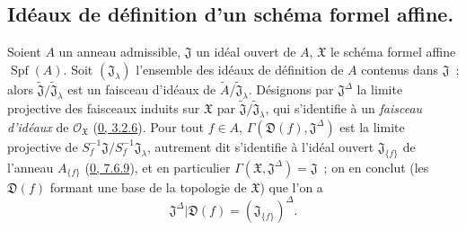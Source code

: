 \subsection{Idéaux de définition d'un schéma formel affine.}
\label{subsection:I.10.3-fr}

\begin{env}[10.3.1]
\label{I.10.3.1-fr}
Soient $A$ un anneau admissible, $\mathfrak{J}$ un idéal ouvert de $A$,
$\mathfrak{X}$ le schéma formel affine $\operatorname{Spf}(A)$. Soit
$(\mathfrak{J}_\lambda)$ l'ensemble des idéaux de définition de $A$
contenus dans $\mathfrak{J}$~; alors
$\widetilde{\mathfrak{J}}/\widetilde{\mathfrak{J}}_\lambda$ est un
faisceau d'idéaux de
$\widetilde{A}/\widetilde{\mathfrak{J}}_\lambda$. Désignons par
$\mathfrak{J}^\Delta$ la limite projective des faisceaux induits sur
$\mathfrak{X}$ par
$\widetilde{\mathfrak{J}}/\widetilde{\mathfrak{J}}_\lambda$, qui
s'identifie à un \emph{faisceau d'idéaux} de
$\mathscr{O}_{\mathfrak{X}}$ (\hyperref[0.3.2.6-fr]{0, 3.2.6}). Pour tout
$f\in A$, $\Gamma(\mathfrak{D}(f),\mathfrak{J}^\Delta)$ est la limite
projective de
$S_f^{-1}\mathfrak{J}/S_f^{-1}\mathfrak{J}_\lambda$, autrement dit
s'identifie à l'idéal ouvert $\mathfrak{J}_{\{f\}}$ de l'anneau
$A_{\{f\}}$ (\hyperref[0.7.6.9-fr]{0, 7.6.9}), et en particulier
$\Gamma(\mathfrak{X},\mathfrak{J}^\Delta)=\mathfrak{J}$~; on en conclut
(les $\mathfrak{D}(f)$ formant une base de la topologie de $\mathfrak{X}$)
que l'on a
\[
  \mathfrak{J}^\Delta|\mathfrak{D}(f)
  =(\mathfrak{J}_{\{f\}})^\Delta.
  \tag{10.3.1.1}\label{I.10.3.1.1-fr}
\]
\end{env}

